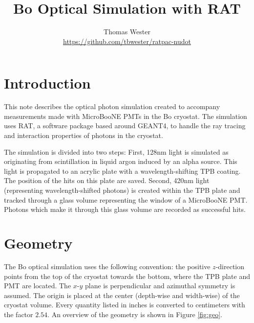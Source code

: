 \documentclass[aps,pra,groupedaddress]{revtex4-1}
\title{Bo Optical Simulation with RAT}
\author{Thomas Wester \\ \small{\href{https://github.com/tbwester/ratpac-nudot}{https://github.com/tbwester/ratpac-nudot}}}
\begin{document}
\maketitle

\begin{abstract}

\end{abstract}

\tableofcontents

\section{Introduction}

This note describes the optical photon simulation created to accompany measurements made with MicroBooNE PMTs in the Bo cryostat. The simulation uses RAT, a software package based around GEANT4, to handle the ray tracing and interaction properties of photons in the cryostat.

The simulation is divided into two steps: First, 128nm light is simulated as originating from scintillation in liquid argon induced by an alpha source. This light is propagated to an acrylic plate with a wavelength-shifting TPB coating. The position of the hits on this plate are saved. Second, 420nm light (representing wavelength-shifted photons) is created within the TPB plate and tracked through a glass volume representing the window of a MicroBooNE PMT. Photons which make it through this glass volume are recorded as successful hits.

\section{Geometry}

The Bo optical simulation uses the following convention: the positive $z$-direction points from the top of the cryostat towards the bottom, where the TPB plate and PMT are located. The $x$-$y$ plane is perpendicular and azimuthal symmetry is assumed. The origin is placed at the center (depth-wise and width-wise) of the cryostat volume. Every quantity listed in inches is converted to centimeters with the factor $2.54$. An overview of the geometry is shown in Figure \ref{fig:geo}.
\end{document}
